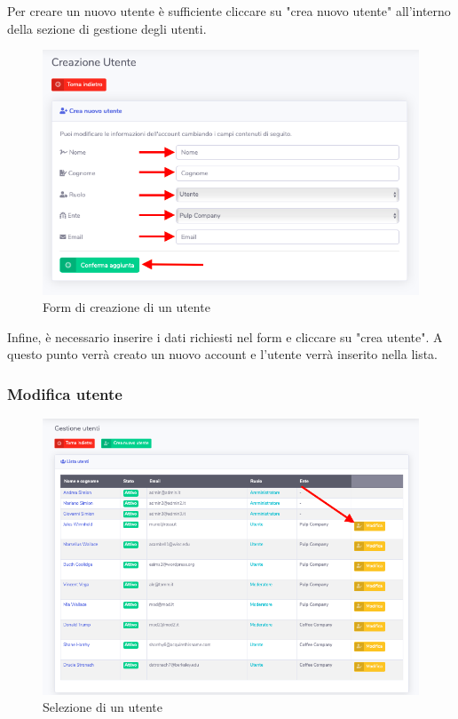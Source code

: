 		Per creare un nuovo utente è sufficiente cliccare su "crea nuovo utente" all'interno della sezione di gestione degli utenti.

		\begin{figure}[H]
		\centering
		\includegraphics[scale=0.600]{res/images/admin/creazUtente.png}
		\caption{Form di creazione di un utente}
	\end{figure}

		Infine, è necessario inserire i dati richiesti nel form e cliccare su "crea utente". 
		A questo punto verrà creato un nuovo account e l'utente verrà inserito nella lista.

	\subsubsection{Modifica utente}

		\begin{figure}[H]
		\centering
		\includegraphics[scale=0.600]{res/images/admin/selModUtente.png}
		\caption{Selezione di un utente}
	\end{figure}

